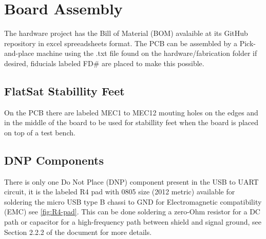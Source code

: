 %
%
%
%
%

%
%
%
%
%
%

\chapter{Board Assembly}

The hardware project has the Bill of Material (BOM) avalaible at its GitHub repository in excel spreeadsheets format. The PCB can be assembled by a Pick-and-place machine using the .txt file found on the hardware/fabrication folder if desired, fiducials labeled FD\# are placed to make this possible.

\section{FlatSat Stabillity Feet}

On the PCB there are labeled MEC1 to MEC12 mouting holes on the edges and in the middle of the board to be used for stabillity feet when the board is placed on top of a test bench.

\section{DNP Components}

There is only one Do Not Place (DNP) component present in the USB to UART circuit, it is the labeled R4 pad with 0805 size (2012 metric) available for soldering the micro USB type B chassi to GND for Electromagnetic compatibility (EMC) see \autoref{fig:R4-pad}. This can be done soldering a zero-Ohm resistor for a DC path or capacitor for a high-frequency path between shield and signal ground, see Section 2.2.2 of the document \cite{ftdi-usb-hardware-guidelines} for more details.

